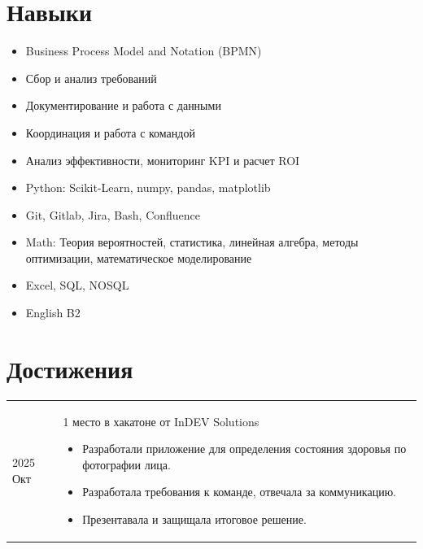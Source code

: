 \documentclass[12pt]{article}
\begin{document}
\section*{Навыки}

\begin{itemize}[before=\setlength{\baselineskip}{0pt}, itemsep=2pt]
    \item Business Process Model and Notation (BPMN)
    \item Сбор и анализ требований
    \item Документирование и работа с данными
    \item Координация и работа с командой
    \item Анализ эффективности, мониторинг KPI и расчет ROI
    \item Python: Scikit-Learn, numpy, pandas, matplotlib
    \item Git, Gitlab, Jira, Bash, Confluence
    \item Math: Теория вероятностей, статистика, линейная алгебра, методы оптимизации, математическое моделирование
    \item Excel, SQL, NOSQL
    \item English B2
\end{itemize}

\section*{Достижения}
\begin{longtable}[l]{@{}p{} p{}}
    2025 Окт
    & 
    1 место в хакатоне от InDEV Solutions

    \begin{itemize}[before=\setlength{\baselineskip}{0pt}, itemsep=2pt]
    \item Разработали приложение для определения состояния здоровья по фотографии лица.
    \item Разработала требования к команде, отвечала за коммуникацию.
    \item Презентавала и защищала итоговое решение.
    \end{itemize}
    \\
\end{longtable}
\end{document}
